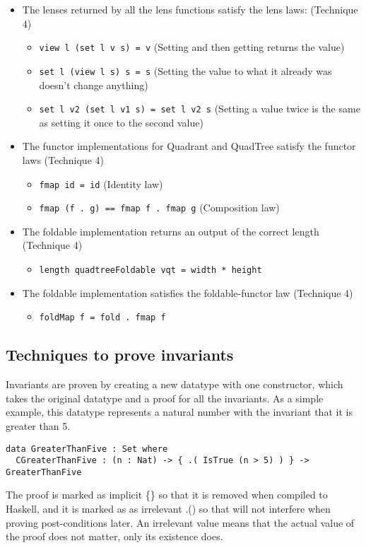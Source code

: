 \begin{itemize}
    \item The lenses returned by all the lens functions satisfy the lens laws: \cite{lens} (Technique 4)
        \begin{itemize}
            \item \verb|view l (set l v s) = v| (Setting and then getting returns the value)
            \item \verb|set l (view l s) s = s| (Setting the value to what it already was doesn't change anything)
            \item \verb|set l v2 (set l v1 s) = set l v2 s| (Setting a value twice is the same as setting it once to the second value)
        \end{itemize}
    \item The functor implementations for Quadrant and QuadTree satisfy the functor laws (Technique 4)
        \begin{itemize}
            \item \verb|fmap id = id| (Identity law)
            \item \verb|fmap (f . g) == fmap f . fmap g| (Composition law)
        \end{itemize}
    \item The foldable implementation returns an output of the correct length (Technique 4)
        \begin{itemize}
            \item \verb|length quadtreeFoldable vqt = width * height|
        \end{itemize}
    \item The foldable implementation satisfies the foldable-functor law (Technique 4)
        \begin{itemize}
            \item \verb|foldMap f = fold . fmap f|
        \end{itemize}
\end{itemize}
	
\setlength{\parindent}{15pt} \setlength{\parskip}{0pt}
\subsection{Techniques to prove invariants} \label{prove_invariants}
Invariants are proven by creating a new datatype with one constructor, which takes the original datatype and a proof for all the invariants. As a simple example, this datatype represents a natural number with the invariant that it is greater than 5.
\begin{verbatim}
data GreaterThanFive : Set where
  CGreaterThanFive : (n : Nat) -> { .( IsTrue (n > 5) ) } -> GreaterThanFive
\end{verbatim}
The proof is marked as implicit \{\} so that it is removed when compiled to Haskell, and it is marked as as irrelevant .() so that will not interfere when proving post-conditions later. An irrelevant value means that the actual value of the proof does not matter, only its existence does.

